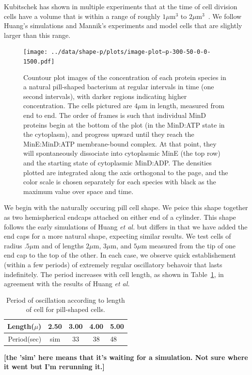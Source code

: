 \documentclass[letterpaper,twocolumn,amsmath,amssymb,pre]{revtex4-1}
\newcommand{\red}[1]{{\bf \color{red} #1}}
\newcommand{\fixme}[1]{\red{[#1]}}
\newcommand\micron{\ensuremath{\mu\text{m}}}
\begin{document}
Kubitschek has shown in multiple experiments that at the time of cell
division cells have a volume that is within a range of roughly
$1\micron^3$ to $2\micron^3$~\cite{kubitschek1990cell,
  kubitschek1968linear}.  We follow Huang's
simulations\cite{huang2003dynamic} and Mannik's experiments and model
cells that are slightly larger than this range.

\begin{figure}
  \texttt{[image: ../data/shape-p/plots/image-plot--p-300-50-0-0-1500.pdf]}
  \caption{Countour plot images of the concentration of each protein
    species in a natural pill-shaped bacterium at regular intervals in
    time (one second intervals), with darker regions indicating higher
    concentration.  The cells pictured are $4\micron$ in length,
    measured from end to end.  The order of frames is such that
    individual MinD proteins begin at the bottom of the plot (in the
    MinD:ATP state in the cytoplasm), and progress upward until they
    reach the MinE:MinD:ATP membrane-bound complex.  At that point,
    they will spontaneously dissociate into cytoplasmic MinE (the top
    row) and the starting state of cytoplasmic MinD:ADP.  The
    densities plotted are integrated along the axis orthogonal to the
    page, and the color scale is chosen separately for each species
    with black as the maximum value over space and time.}
  \label{image-p}
\end{figure}

We begin with the naturally occuring pill cell shape.  We peice this
shape together as two hemispherical endcaps attached on either end of
a cylinder.  This shape follows the early simulations of Huang
\emph{et al.} but differs in that we have added the end caps for a
more natural shape, expecting similar results.  We test cells of
radius $.5\micron$ and of lengths $2\micron$, $3\micron$, and
$5\micron$ measured from the tip of one end cap to the top of the
other. In each case, we observe quick establishement (within a few
periods) of extremely regular oscillatory behavoir that lasts
indefinitely.  The period increases with cell length, as shown in
Table~\ref{tab:pill-periods}, in agreement with the results of Huang
\emph{et al.}

\begin{table}
  \begin{tabular}{|r|c|c|c|l|}
    \hline
    Length($\mu$) & 2.50 & 3.00 & 4.00 & 5.00\\
    \hline
    Period(sec) & sim & 33 & 38 & 48 \\ \cline{2-2}
    \hline
  \end{tabular}
  \caption{Period of oscillation according to length of cell for
    pill-shaped cells.}\label{tab:pill-periods}\fixme{the 'sim' here
    means that it's waiting for a simulation.  Not sure where it went
    but I'm rerunning it.}
\end{table}
\end{document}
